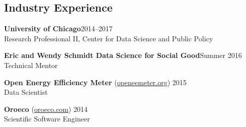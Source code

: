 \documentclass[margin,line]{resume}
\begin{document}
\begin{resume}
        \section{\mysidestyle Industry Experience}
	{\bf University of Chicago}\hfill{2014--2017}\\
	Research Professional II, Center for Data Science and Public Policy

        {\bf Eric and Wendy Schmidt Data Science for Social Good}\hfill{Summer 2016}\\
	Technical Mentor

	{\bf Open Energy Efficiency Meter} (\href{http://www.openeemeter.org/}{openeemeter.org}) \hfill {2015} \\
	Data Scientist

	{\bf Oroeco} (\href{http://www.oroeco.com}{oroeco.com}) \hfill {2014} \\
	Scientific Software Engineer %

\end{resume}
\end{document}
